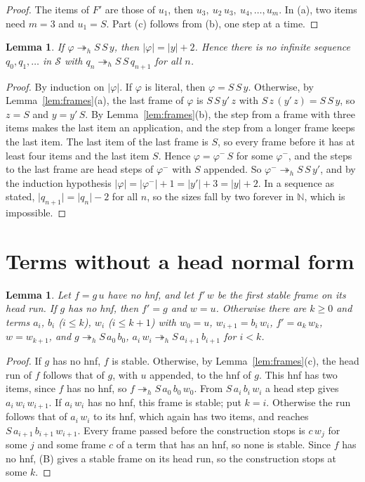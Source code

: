 \documentclass[11pt]{amsart}
\newtheorem{lemma}[theorem]{Lemma}
\newcommand{\Ter}{\mathcal S}
\newcommand{\hred}{\twoheadrightarrow_h}
\newcommand{\sz}[1]{\lvert#1\rvert}
\begin{document}
\begin{proof}
The items of $F'$ are those of $u_1$, then $u_3,\ u_2\,u_3,\ u_4,\dots,u_m$. In (a), two items
need $m=3$ and $u_1=S$. Part (c) follows from (b), one step at a time.
\end{proof}

\begin{lemma}\label{lem:ss}
If $\varphi\hred S\,S\,y$, then $\sz\varphi=\sz y+2$. Hence there is no infinite sequence
$q_0,q_1,\dots$ in $\Ter$ with $q_n\hred S\,S\,q_{n+1}$ for all $n$.
\end{lemma}

\begin{proof}
By induction on $\sz\varphi$. If $\varphi$ is literal, then $\varphi=S\,S\,y$. Otherwise, by
Lemma~\ref{lem:frames}(a), the last frame of $\varphi$ is $S\,S\,y'\,z$ with
$S\,z\,(y'\,z)=S\,S\,y$, so $z=S$ and $y=y'\,S$. By Lemma~\ref{lem:frames}(b), the step from a
frame with three items makes the last item an application, and the step from a longer frame keeps
the last item. The last item of the last frame is $S$, so every frame before it has at least four
items and the last item $S$. Hence $\varphi=\varphi^-\,S$ for some $\varphi^-$, and the steps to
the last frame are head steps of $\varphi^-$ with $S$ appended. So $\varphi^-\hred S\,S\,y'$, and by the induction hypothesis
$\sz\varphi=\sz{\varphi^-}+1=\sz{y'}+3=\sz y+2$. In a sequence as stated,
$\sz{q_{n+1}}=\sz{q_n}-2$ for all $n$, so the sizes fall by two forever in $\mathbb N$, which is
impossible.
\end{proof}

\section{Terms without a head normal form}

\begin{lemma}\label{lem:moves}
Let $f=g\,u$ have no hnf, and let $f'\,w$ be the first stable frame on its head run. If $g$ has
no hnf, then $f'=g$ and $w=u$. Otherwise there are $k\ge0$ and terms $a_i$, $b_i$ \textup{(}$i\le k$\textup{)}, $w_i$
\textup{(}$i\le k+1$\textup{)} with
$w_0=u$, $w_{i+1}=b_i\,w_i$, $f'=a_k\,w_k$, $w=w_{k+1}$, and
$g\hred S\,a_0\,b_0$, $a_i\,w_i\hred S\,a_{i+1}\,b_{i+1}$ for $i<k$.
\end{lemma}

\begin{proof}
If $g$ has no hnf, $f$ is stable. Otherwise, by Lemma~\ref{lem:frames}(c), the head run of $f$
follows that of $g$, with $u$ appended, to the hnf of $g$. This hnf has two items, since $f$ has no
hnf, so $f\hred S\,a_0\,b_0\,w_0$. From $S\,a_i\,b_i\,w_i$ a head step gives $a_i\,w_i\,w_{i+1}$.
If $a_i\,w_i$ has no hnf, this frame is stable; put $k=i$. Otherwise the run follows that of
$a_i\,w_i$ to its hnf, which again has two items, and reaches $S\,a_{i+1}\,b_{i+1}\,w_{i+1}$.
Every frame passed before the construction stops is $c\,w_j$ for some $j$ and some frame $c$ of a
term that has an hnf, so none is stable. Since $f$ has no hnf, (B) gives a stable frame on its
head run, so the construction stops at some $k$.
\end{proof}
\end{document}
